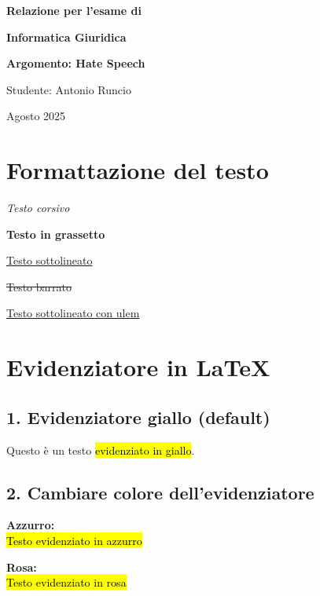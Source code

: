 \documentclass[12pt]{book}
\begin{document}
\begin{titlepage}
    \centering
    \vspace*{4cm}
    {\LARGE\textbf{Relazione per l'esame di }\par}
    {\LARGE\textbf{Informatica Giuridica}\par}
    \vspace{4cm}
    {\Large\textbf{Argomento: Hate Speech}\par}
    \vspace{1cm}
    \vfill
    {\large Studente: Antonio Runcio\par}
    \vspace{0.5cm}
    {\large Agosto 2025\par}
    \thispagestyle{empty} %
\end{titlepage}



\section*{Formattazione del testo}
\textit{Testo corsivo}

\textbf{Testo in grassetto}

\underline{Testo sottolineato}

\sout{Testo barrato} %

\uline{Testo sottolineato con ulem} %


\newpage

\section*{Evidenziatore in LaTeX}

\subsection*{1. Evidenziatore giallo (default)}
Questo è un testo \hl{evidenziato in giallo}.

\subsection*{2. Cambiare colore dell'evidenziatore}

\textbf{Azzurro:}\\
{\hl{Testo evidenziato in azzurro}}

\vspace{5pt}
\textbf{Rosa:}\\
{\hl{Testo evidenziato in rosa}}
\end{document}
